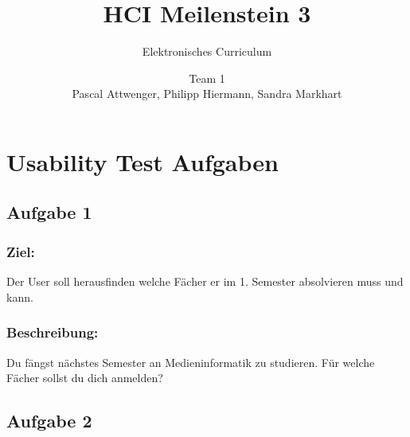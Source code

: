 \documentclass[a4paper,10pt]{scrartcl}
\title{HCI Meilenstein 3}
\subtitle{Elektronisches Curriculum}
\author{Team 1 \\Pascal Attwenger, Philipp Hiermann, Sandra Markhart}
\begin{document}
\maketitle

\section{Usability Test Aufgaben}

\subsection{Aufgabe 1}

\noindent{}
\medskip

\subsubsection*{Ziel:}
 
Der User soll herausfinden welche Fächer er im 1. Semester absolvieren muss und kann.
 
\subsubsection*{Beschreibung:}

Du fängst nächstes Semester an Medieninformatik zu studieren. Für welche Fächer sollst du dich anmelden?
 
\subsection{Aufgabe 2}

\noindent{}
\medskip
\end{document}
